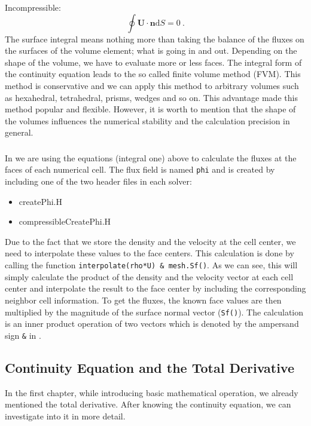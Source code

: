 \documentclass[MathematicsNumericsDerivationsAndOpenFOAM.tex]{subfiles}
\begin{document}
	Incompressible:
%
%
\begin{equation}
 \boxed{
    \oint \textbf{U} \cdot \textbf{n} \mathrm{d}S = 0
   } ~.
\end{equation}
%
%
	The surface integral means nothing more than taking the balance of
    the fluxes on the surfaces of the volume element; what is going in
    and out. Depending on the shape of the volume, we have to evaluate
    more or less faces. The integral form of the continuity equation leads
    to the so called finite volume method (FVM). This method is conservative
    and we can apply this method to arbitrary volumes such as hexahedral,
    tetrahedral, prisms, wedges and so on. This advantage made this method
    popular and flexible. However, it is worth to mention that the shape
    of the volumes influences the numerical stability and the calculation
    precision in general.
%
%
%
%
%
\subsubsection{\OF}
%
%
	In \OF we are using the equations (integral one) above to calculate
    the fluxes at the faces of each numerical cell. The flux field is
    named \texttt{phi} and is created by including one of the two header
    files in each solver:
%
%
\begin{itemize}
 \item createPhi.H
 \item compressibleCreatePhi.H
\end{itemize}
%
%
	Due to the fact that we store the density and the velocity at the
    cell center, we need to interpolate these values to the face centers.
    This calculation is done by calling the function
    \texttt{interpolate(rho*U) \& mesh.Sf()}. As we can see, this will
    simply calculate the product of the density and the velocity vector
    at each cell center and interpolate the result to the face center by
    including the corresponding neighbor cell information. To get the fluxes,
    the known face values are then multiplied by the magnitude of the surface
    normal vector (\texttt{Sf()}). The calculation is an inner product
    operation of two vectors which is denoted by the ampersand sign
    \texttt{\&} in \OF.
%
%
%
%
%
\subsection{Continuity Equation and the Total Derivative}
%
%
	In the first chapter, while introducing basic mathematical operation,
    we already mentioned the total derivative. After knowing the continuity
    equation, we can investigate into it in more detail.
\end{document}
